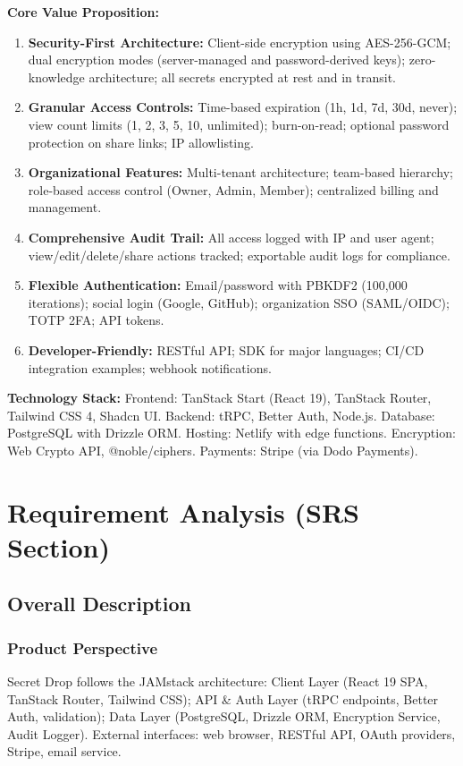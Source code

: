 \documentclass[12pt,a4paper]{article}
\begin{document}
\textbf{Core Value Proposition:}
\begin{enumerate}[leftmargin=*]
  \item \textbf{Security-First Architecture:} Client-side encryption using AES-256-GCM; dual encryption modes (server-managed and password-derived keys); zero-knowledge architecture; all secrets encrypted at rest and in transit.
  \item \textbf{Granular Access Controls:} Time-based expiration (1h, 1d, 7d, 30d, never); view count limits (1, 2, 3, 5, 10, unlimited); burn-on-read; optional password protection on share links; IP allowlisting.
  \item \textbf{Organizational Features:} Multi-tenant architecture; team-based hierarchy; role-based access control (Owner, Admin, Member); centralized billing and management.
  \item \textbf{Comprehensive Audit Trail:} All access logged with IP and user agent; view/edit/delete/share actions tracked; exportable audit logs for compliance.
  \item \textbf{Flexible Authentication:} Email/password with PBKDF2 (100,000 iterations); social login (Google, GitHub); organization SSO (SAML/OIDC); TOTP 2FA; API tokens.
  \item \textbf{Developer-Friendly:} RESTful API; SDK for major languages; CI/CD integration examples; webhook notifications.
\end{enumerate}

\textbf{Technology Stack:} Frontend: TanStack Start (React 19), TanStack Router, Tailwind CSS 4, Shadcn UI. Backend: tRPC, Better Auth, Node.js. Database: PostgreSQL with Drizzle ORM. Hosting: Netlify with edge functions. Encryption: Web Crypto API, @noble/ciphers. Payments: Stripe (via Dodo Payments).

\section{Requirement Analysis (SRS Section)}

\subsection{Overall Description}

\subsubsection{Product Perspective}
Secret Drop follows the JAMstack architecture: Client Layer (React 19 SPA, TanStack Router, Tailwind CSS); API \& Auth Layer (tRPC endpoints, Better Auth, validation); Data Layer (PostgreSQL, Drizzle ORM, Encryption Service, Audit Logger). External interfaces: web browser, RESTful API, OAuth providers, Stripe, email service.
\end{document}
